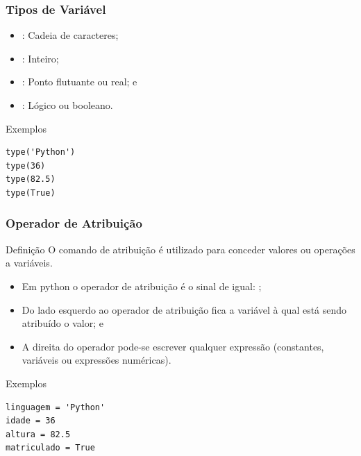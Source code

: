 \documentclass{beamer}
\begin{document}
\begin{frame}[fragile]
\frametitle{Tipos de Variável}

\begin{itemize}
	\item {} : Cadeia de caracteres;
	\item {} : Inteiro;
	\item {} : Ponto flutuante ou real; e
	\item {} : Lógico ou booleano.
\end{itemize}\vfill

\begin{exampleblock}{Exemplos}
\begin{lstlisting}
type('Python')
type(36)
type(82.5)
type(True)
\end{lstlisting}
\end{exampleblock}
\end{frame}

\begin{frame}[fragile]
\frametitle{Operador de Atribuição}

\begin{block}{Definição}
O comando de atribuição é utilizado para conceder valores ou operações a variáveis.
\end{block}\vfill

\begin{itemize}
	\item Em python o operador de atribuição é o sinal de igual: \structure{=};
	\item Do lado esquerdo ao operador de atribuição fica a variável à qual está
	sendo atribuído o valor; e
	\item A direita do operador pode-se escrever qualquer expressão (constantes,
	variáveis ou expressões numéricas).
\end{itemize}\vfill

\begin{exampleblock}{Exemplos}
	\begin{lstlisting}
linguagem = 'Python'
idade = 36
altura = 82.5
matriculado = True
	\end{lstlisting}
\end{exampleblock}
\end{frame}
\end{document}
